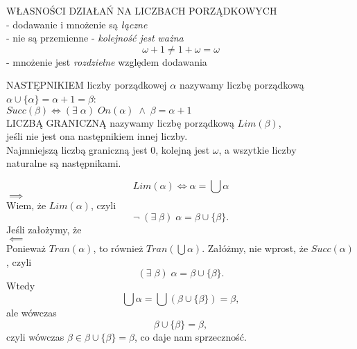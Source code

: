 {\large\color{acc}WŁASNOŚCI DZIAŁAŃ NA LICZBACH PORZĄDKOWYCH}\medskip\\
\indent - dodawanie i mnożenie są \emph{łączne}\smallskip\\
\indent - nie są przemienne - \emph{kolejność jest ważna}
$$\omega+1\neq1+\omega=\omega$$
\indent - mnożenie jest \emph{rozdzielne }względem dodawania\medskip\\
\medskip
\begin{center}\large
    {\color{def}NASTĘPNIKIEM }liczby porządkowej $\alpha$ nazywamy liczbę porządkową $\alpha\cup\{\alpha\}=\alpha+1=\beta$:\smallskip\\
    $Succ(\beta)\iff(\exists\;\alpha)\;On(\alpha)\;\land\;\beta=\alpha+1$\medskip\\
    {\color{def}LICZBĄ GRANICZNĄ} nazywamy liczbę porządkową $Lim(\beta)$, \\jeśli nie jest ona następnikiem innej liczby.\medskip\\
    \normalsize Najmniejszą liczbą graniczną jest 0, kolejną jest $\omega$, a wszytkie liczby \\naturalne są następnikami.
\end{center}\bigskip

{\large
$$Lim(\alpha)\iff\alpha=\bigcup\alpha$$}
\dowod
$\implies$\medskip\\
Wiem, że $Lim(\alpha)$, czyli
$$\neg\;(\exists\;\beta)\;\alpha=\beta\cup\{\beta\}.$$
Jeśli założymy, że \bigskip\\
$\impliedby$\medskip\\
Ponieważ $Tran(\alpha)$, to również $Tran(\bigcup\alpha)$. Załóżmy, nie wprost, że $Succ(\alpha)$, czyli
$$(\exists\;\beta)\;\alpha=\beta\cup\{\beta\}.$$
Wtedy
$$\bigcup\alpha=\bigcup(\beta\cup\{\beta\})=\beta,$$
ale wówczas
$$\beta\cup\{\beta\}=\beta,$$
czyli wówczas $\beta\in\beta\cup\{\beta\}=\beta$, co daje nam sprzeczność.

